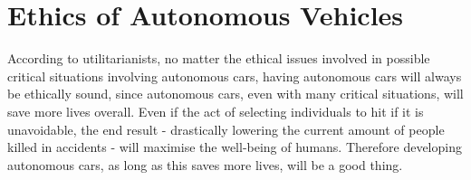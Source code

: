\chapter{Ethics of Autonomous Vehicles}

According to utilitarianists, no matter the ethical issues involved in possible critical situations involving autonomous cars, having autonomous cars will always be ethically sound, since autonomous cars, even with many critical situations, will save more lives overall. Even if the act of selecting individuals to hit if it is unavoidable, the end result - drastically lowering the current amount of people killed in accidents - will maximise the well-being of humans. Therefore developing autonomous cars, as long as this saves more lives, will be a good thing. 